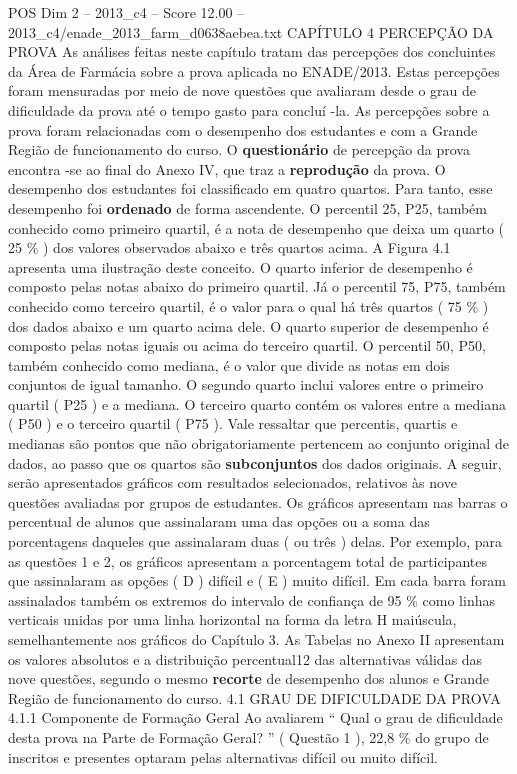 \begin{textsample}{POS Dim 2 – 2013\_c4 – Score 12.00 – 2013\_c4/enade\_2013\_farm\_d0638aebea.txt}  \label{ex:f2_pos_069}
CAPÍTULO 4 PERCEPÇÃO DA PROVA As análises feitas neste capítulo tratam das percepções dos concluintes da Área de Farmácia sobre a prova aplicada no ENADE/2013.
Estas percepções foram mensuradas por meio de nove questões que avaliaram desde o grau de dificuldade da prova até o tempo gasto para concluí -la.
As percepções sobre a prova foram relacionadas com o desempenho dos estudantes e com a Grande Região de funcionamento do curso.
O \textbf{questionário} de percepção da prova encontra -se ao final do Anexo IV, que traz a \textbf{reprodução} da prova.
O desempenho dos estudantes foi classificado em quatro quartos.
Para tanto, esse desempenho foi \textbf{ordenado} de forma ascendente.
O percentil 25, P25, também conhecido como primeiro quartil, é a nota de desempenho que deixa um quarto ( 25 \% ) dos valores observados abaixo e três quartos acima.
A Figura 4.1 apresenta uma ilustração deste conceito.
O quarto inferior de desempenho é composto pelas notas abaixo do primeiro quartil.
Já o percentil 75, P75, também conhecido como terceiro quartil, é o valor para o qual há três quartos ( 75 \% ) dos dados abaixo e um quarto acima dele.
O quarto superior de desempenho é composto pelas notas iguais ou acima do terceiro quartil.
O percentil 50, P50, também conhecido como mediana, é o valor que divide as notas em dois conjuntos de igual tamanho.
O segundo quarto inclui valores entre o primeiro quartil ( P25 ) e a mediana.
O terceiro quarto contém os valores entre a mediana ( P50 ) e o terceiro quartil ( P75 ).
Vale ressaltar que percentis, quartis e medianas são pontos que não obrigatoriamente pertencem ao conjunto original de dados, ao passo que os quartos são \textbf{subconjuntos} dos dados originais.
A seguir, serão apresentados gráficos com resultados selecionados, relativos às nove questões avaliadas por grupos de estudantes.
Os gráficos apresentam nas barras o percentual de alunos que assinalaram uma das opções ou a soma das porcentagens daqueles que assinalaram duas ( ou três ) delas.
Por exemplo, para as questões 1 e 2, os gráficos apresentam a porcentagem total de participantes que assinalaram as opções ( D ) difícil e ( E ) muito difícil.
Em cada barra foram assinalados também os extremos do intervalo de confiança de 95 \% como linhas verticais unidas por uma linha horizontal na forma da letra H maiúscula, semelhantemente aos gráficos do Capítulo 3.
As Tabelas no Anexo II apresentam os valores absolutos e a distribuição percentual12 das alternativas válidas das nove questões, segundo o mesmo \textbf{recorte} de desempenho dos alunos e Grande Região de funcionamento do curso. 4.1 GRAU DE DIFICULDADE DA PROVA 4.1.1 Componente de Formação Geral Ao avaliarem “ Qual o grau de dificuldade desta prova na Parte de Formação Geral? ” ( Questão 1 ), 22,8 \% do grupo de inscritos e presentes optaram pelas alternativas difícil ou muito difícil.

\end{textsample}
